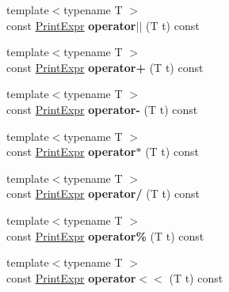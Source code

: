 \begin{DoxyCompactItemize}
\item 
\hypertarget{classPrintExpr_a5a4633ab68787949747c9ca2e7eb0494}{{\footnotesize template$<$typename T $>$ }\\const \hyperlink{classPrintExpr}{Print\-Expr} {\bfseries operator$\vert$$\vert$} (T t) const }\label{classPrintExpr_a5a4633ab68787949747c9ca2e7eb0494}

\item 
\hypertarget{classPrintExpr_acfd705ab100ac58b066f7823c2c9d117}{{\footnotesize template$<$typename T $>$ }\\const \hyperlink{classPrintExpr}{Print\-Expr} {\bfseries operator+} (T t) const }\label{classPrintExpr_acfd705ab100ac58b066f7823c2c9d117}

\item 
\hypertarget{classPrintExpr_a44da6da34b92f6fa2cc28c483717b21f}{{\footnotesize template$<$typename T $>$ }\\const \hyperlink{classPrintExpr}{Print\-Expr} {\bfseries operator-\/} (T t) const }\label{classPrintExpr_a44da6da34b92f6fa2cc28c483717b21f}

\item 
\hypertarget{classPrintExpr_a147efe242acccf6e06dcbfd5f041e359}{{\footnotesize template$<$typename T $>$ }\\const \hyperlink{classPrintExpr}{Print\-Expr} {\bfseries operator$\ast$} (T t) const }\label{classPrintExpr_a147efe242acccf6e06dcbfd5f041e359}

\item 
\hypertarget{classPrintExpr_aa03eab3fe2e4da88bf4db4c0d4ad6c77}{{\footnotesize template$<$typename T $>$ }\\const \hyperlink{classPrintExpr}{Print\-Expr} {\bfseries operator/} (T t) const }\label{classPrintExpr_aa03eab3fe2e4da88bf4db4c0d4ad6c77}

\item 
\hypertarget{classPrintExpr_a222c337f6a22f82572657a3065efbb74}{{\footnotesize template$<$typename T $>$ }\\const \hyperlink{classPrintExpr}{Print\-Expr} {\bfseries operator\%} (T t) const }\label{classPrintExpr_a222c337f6a22f82572657a3065efbb74}

\item 
\hypertarget{classPrintExpr_a0c8aec39de660997774341edcc500215}{{\footnotesize template$<$typename T $>$ }\\const \hyperlink{classPrintExpr}{Print\-Expr} {\bfseries operator$<$$<$} (T t) const }\label{classPrintExpr_a0c8aec39de660997774341edcc500215}


\end{DoxyCompactItemize}
